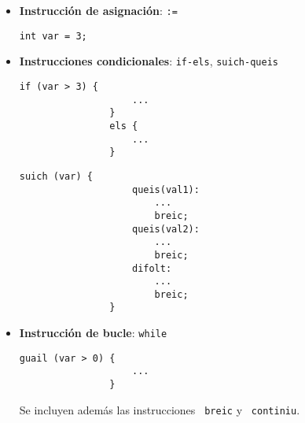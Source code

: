 \documentclass[10pt,a4paper]{article}
\begin{document}
\begin{itemize}
    \item \textbf{Instrucción de asignación}: \texttt{:=}
    \begin{center}
        \begin{minipage}{\linewidth}
            \begin{lstlisting}[linewidth=0.3\linewidth, gobble=16]
                int var = 3;
            \end{lstlisting}
        \end{minipage}
    \end{center}
    
    \item \textbf{Instrucciones condicionales}: \texttt{if-els}, \texttt{suich-queis}
    \begin{center}
        \begin{minipage}{\linewidth}
            \begin{lstlisting}[linewidth=0.3\linewidth, gobble=16]
                if (var > 3) {
                    ...
                }
                els {
                    ...
                }
            \end{lstlisting}
        \end{minipage}
    \end{center}
    \begin{center}
        \begin{minipage}{\linewidth}
            \begin{lstlisting}[linewidth=0.3\linewidth, gobble=16]
                suich (var) {
                    queis(val1):
                        ...
                        breic;
                    queis(val2):
                        ...
                        breic;
                    difolt:
                        ...
                        breic;
                }
            \end{lstlisting}
        \end{minipage}
    \end{center}

    \item \textbf{Instrucción de bucle}: \texttt{while}
    \begin{center}
        \begin{minipage}{\linewidth}
            \begin{lstlisting}[linewidth=0.3\linewidth, gobble=16]
                guail (var > 0) {
                    ...
                }
            \end{lstlisting}
        \end{minipage}
    \end{center}
    Se incluyen además las instrucciones \texttt{\color{blue} breic} y \texttt{\color{blue} continiu}.


\end{itemize}
\end{document}
